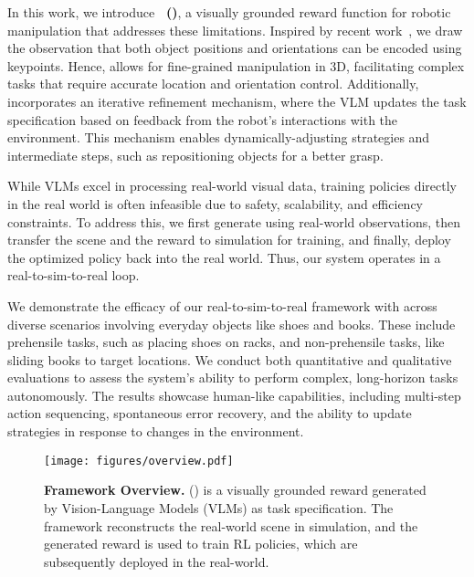 In this work, we introduce \textbf{\algname~(\algabrvname)}, a visually grounded reward function for robotic manipulation that addresses these limitations. %
Inspired by recent work~\cite{huang2024rekep}, we draw the observation that both object positions and orientations can be encoded using keypoints. Hence, \algabrvname allows for fine-grained manipulation in 3D, facilitating complex tasks that require accurate location and orientation control. Additionally, \algabrvname incorporates an iterative refinement mechanism, where the VLM updates the task specification based on feedback from the robot's interactions with the environment. This mechanism enables %
dynamically-adjusting strategies and intermediate steps, such as repositioning objects for a better grasp.


While VLMs excel in processing real-world visual data, training policies directly in the real world is often infeasible due to safety, scalability, and efficiency constraints. To address this, we first generate \algabrvname using real-world observations, then transfer the scene and the reward to simulation for training, and finally, deploy the optimized policy back into the real world. Thus, our system operates in a real-to-sim-to-real loop. %


We demonstrate the efficacy of our real-to-sim-to-real framework with \algabrvname across diverse scenarios involving everyday objects like shoes and books. These include prehensile tasks, such as placing shoes on racks, and non-prehensile tasks, like sliding books to target locations. We conduct both quantitative and qualitative evaluations to assess the system's ability to perform complex, long-horizon tasks autonomously. The results showcase human-like capabilities, including multi-step action sequencing, spontaneous error recovery, and the ability to update strategies in response to changes in the environment.


\begin{figure*}[t]
    \setlength{\abovecaptionskip}{-12pt}
    \centering
    \texttt{[image: figures/overview.pdf]}
    \vspace{-4.8em} %
    \captionsetup{type=figure}
    \caption{\small{\textbf{Framework Overview.} \algname (\algabrvname) is a visually grounded reward generated by Vision-Language Models (VLMs) as task specification. The framework reconstructs the real-world scene in simulation, and the generated reward is used to train RL policies, which are subsequently deployed in the real-world.}}
    \label{fig:overview}
    \vspace{-1.5em}
\end{figure*}
